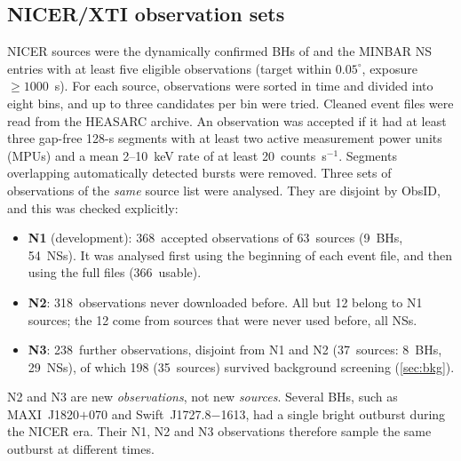 \documentclass[11pt,a4paper]{article}
\begin{document}
\subsection{NICER/XTI observation sets}\label{sec:nicer}
NICER sources were the dynamically confirmed BHs of \citet{Marcel2026} and the MINBAR NS entries with at least five
eligible observations (target within $0.05^\circ$, exposure $\geq1000$~s). For each source, observations were sorted
in time and divided into eight bins, and up to three candidates per bin were tried. Cleaned event files were read from
the HEASARC archive. An observation was accepted if it had at least three gap-free 128-s segments with at least two
active measurement power units (MPUs) and a mean 2--10~keV rate of at least 20~counts~s$^{-1}$. Segments overlapping
automatically detected bursts were removed. Three sets of observations of the \emph{same} source list were analysed.
They are disjoint by ObsID, and this was checked explicitly:
\begin{itemize}\setlength\itemsep{1pt}
\item \textbf{N1} (development): 368~accepted observations of 63~sources (9~BHs, 54~NSs). It was analysed first using
the beginning of each event file, and then using the full files (366~usable).
\item \textbf{N2}: 318~observations never downloaded before. All but 12 belong to N1 sources; the 12 come from sources
that were never used before, all NSs.
\item \textbf{N3}: 238~further observations, disjoint from N1 and N2 (37~sources: 8~BHs, 29~NSs), of which 198
(35~sources) survived background screening (\cref{sec:bkg}).
\end{itemize}
N2 and N3 are new \emph{observations}, not new \emph{sources}. Several BHs, such as MAXI~J1820$+$070 and
Swift~J1727.8$-$1613, had a single bright outburst during the NICER era. Their N1, N2 and N3 observations therefore
sample the same outburst at different times.
\end{document}
